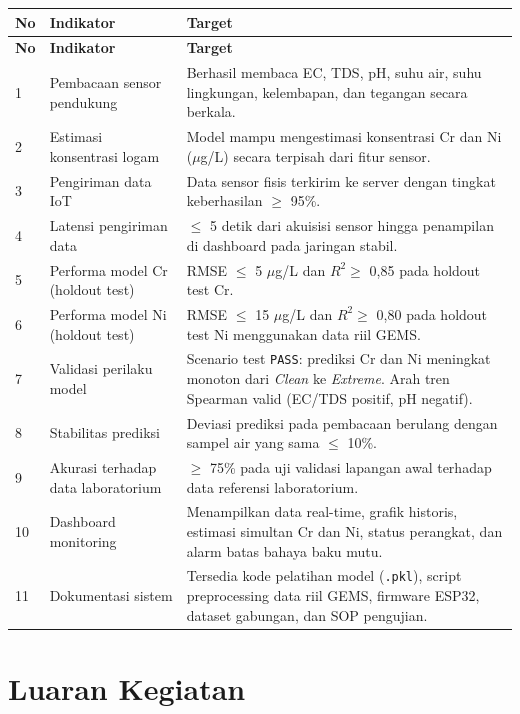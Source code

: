 \documentclass[12pt,a4paper]{article}
\begin{document}
\begin{longtable}{|p{0.5cm}|p{5.5cm}|p{6cm}|}
\hline
\textbf{No} & \textbf{Indikator} & \textbf{Target} \\
\hline
\endfirsthead
\hline
\textbf{No} & \textbf{Indikator} & \textbf{Target} \\
\hline
\endhead
1 & Pembacaan sensor pendukung & Berhasil membaca EC, TDS, pH, suhu air, suhu lingkungan, kelembapan, dan tegangan secara berkala. \\
\hline
2 & Estimasi konsentrasi logam & Model mampu mengestimasi konsentrasi Cr dan Ni ($\mu$g/L) secara terpisah dari fitur sensor. \\
\hline
3 & Pengiriman data IoT & Data sensor fisis terkirim ke server dengan tingkat keberhasilan $\geq$ 95\%. \\
\hline
4 & Latensi pengiriman data & $\leq$ 5 detik dari akuisisi sensor hingga penampilan di dashboard pada jaringan stabil. \\
\hline
5 & Performa model Cr (holdout test) & RMSE $\leq$ 5 $\mu$g/L dan $R^2 \geq$ 0{,}85 pada holdout test Cr. \\
\hline
6 & Performa model Ni (holdout test) & RMSE $\leq$ 15 $\mu$g/L dan $R^2 \geq$ 0{,}80 pada holdout test Ni menggunakan data riil GEMS. \\
\hline
7 & Validasi perilaku model & Scenario test \texttt{PASS}: prediksi Cr dan Ni meningkat monoton dari \textit{Clean} ke \textit{Extreme}. Arah tren Spearman valid (EC/TDS positif, pH negatif). \\
\hline
8 & Stabilitas prediksi & Deviasi prediksi pada pembacaan berulang dengan sampel air yang sama $\leq$ 10\%. \\
\hline
9 & Akurasi terhadap data laboratorium & $\geq$ 75\% pada uji validasi lapangan awal terhadap data referensi laboratorium. \\
\hline
10 & Dashboard monitoring & Menampilkan data real-time, grafik historis, estimasi simultan Cr dan Ni, status perangkat, dan alarm batas bahaya baku mutu. \\
\hline
11 & Dokumentasi sistem & Tersedia kode pelatihan model (\texttt{.pkl}), script preprocessing data riil GEMS, firmware ESP32, dataset gabungan, dan SOP pengujian. \\
\hline
\end{longtable}

\section{Luaran Kegiatan}
\end{document}
